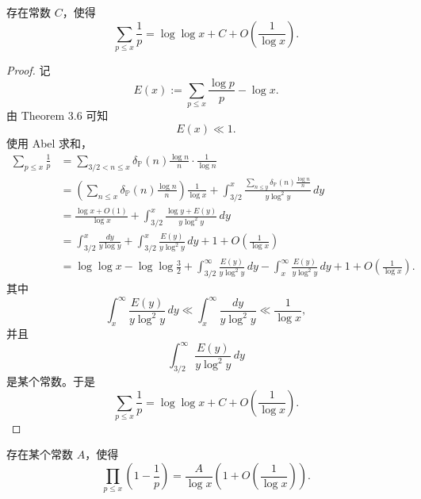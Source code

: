 \begin{theorem}[原文 Theorem 3.7]
	存在常数 $C$，使得
	\[
		\sum_{p\leq x}\frac1p
		=
		\log\log x+C+O\left(\frac1{\log x}\right).
	\]
\end{theorem}

\begin{proof}
	记
	\[
		E(x):=\sum_{p\leq x}\frac{\log p}{p}-\log x.
	\]
	由 Theorem 3.6 可知
	\[
		E(x)\ll 1.
	\]
	使用 Abel 求和，
	\[
		\begin{aligned}
			\sum_{p\leq x}\frac1p
			&=
			\sum_{3/2<n\leq x}
			\delta_{\mathbb P}(n)\frac{\log n}{n}\cdot\frac1{\log n} \\
			&=
			\left(\sum_{n\leq x}\delta_{\mathbb P}(n)\frac{\log n}{n}\right)\frac1{\log x}
			+
			\int_{3/2}^x
			\frac{\sum_{n\leq y}\delta_{\mathbb P}(n)\frac{\log n}{n}}{y\log^2 y}\,dy \\
		&=
		\frac{\log x+O(1)}{\log x}
		+
		\int_{3/2}^x\frac{\log y+E(y)}{y\log^2 y}\,dy \\
		&=
		\int_{3/2}^x\frac{dy}{y\log y}
		+
		\int_{3/2}^x\frac{E(y)}{y\log^2 y}\,dy
		+
		1+O\left(\frac1{\log x}\right) \\
		&=
		\log\log x-\log\log\frac32
		+
		\int_{3/2}^{\infty}\frac{E(y)}{y\log^2 y}\,dy
		-
		\int_x^\infty\frac{E(y)}{y\log^2 y}\,dy
		+
		1+O\left(\frac1{\log x}\right).
	\end{aligned}
	\]
	其中
	\[
		\int_x^\infty\frac{E(y)}{y\log^2 y}\,dy
		\ll
		\int_x^\infty\frac{dy}{y\log^2 y}
		\ll
		\frac1{\log x},
	\]
	并且
	\[
		\int_{3/2}^{\infty}\frac{E(y)}{y\log^2 y}\,dy
	\]
	是某个常数。于是
	\[
		\sum_{p\leq x}\frac1p
		=
		\log\log x+C+O\left(\frac1{\log x}\right).
	\]
\end{proof}

\begin{theorem}[原文 Theorem 3.8]
	存在某个常数 $A$，使得
	\[
		\prod_{p\leq x}\left(1-\frac1p\right)
		=
		\frac{A}{\log x}
		\left(1+O\left(\frac1{\log x}\right)\right).
	\]
\end{theorem}

